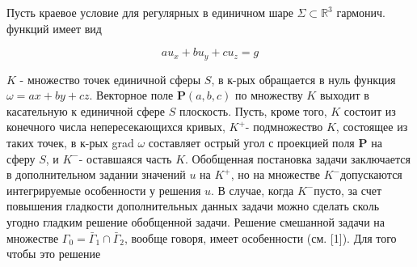 \documentclass[10pt]{article}
\begin{document}
Пусть краевое условие для регулярных в единичном шаре $\Sigma \subset \mathbb{R}^{3}$ гармонич. функций имеет вид



\[

a u_{x}+b u_{y}+c u_{z}=g

\]



$K$ - множество точек единичной сферы $S$, в к-рых обращается в нуль функция $\omega=a x+b y+c z$. Векторное поле $\boldsymbol{P}(a, b, c)$ по множеству $K$ выходит в касательную к единичной сфере $S$ плоскость. Пусть, кроме того, $K$ состоит из конечного числа непересекающихся кривых, $K^{+}$- подмножество $K$, состоящее из таких точек, в к-рых grad $\omega$ составляет острый угол с проекцией поля $\boldsymbol{P}$ на сферу $S$, и $K^{-}$- оставшаяся часть $K$. Обобщенная постановка задачи заключается в дополнительном задании значений $u$ на $K^{+}$, но на множестве $K^{-}$допускаются интегрируемые особенности у решения $u$. В случае, когда $K^{-}$пусто, за счет повышения гладкости дополнительных данных задачи можно сделать сколь угодно гладким решение обобщенной задачи. Решение смешанной задачи на множестве $\Gamma_{0}=\bar{\Gamma}_{1} \cap \bar{\Gamma}_{2}$, вообще говоря, имеет особенности (см. [1]). Для того чтобы это решение
\end{document}
